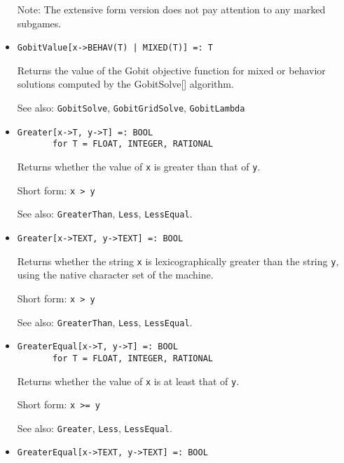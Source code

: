 \begin{itemize}
\item
[Note:] The extensive form version does not pay attention to any marked
subgames.
\ed

\item
\protect \large \begin{verbatim}
GobitValue[x->BEHAV(T) | MIXED(T)] =: T
\end{verbatim}\normalsize

\bd
Returns the value of the Gobit objective function for mixed or behavior solutions
computed by the GobitSolve[] algorithm. 
\item
[See also:] {\tt GobitSolve}, {\tt GobitGridSolve}, {\tt GobitLambda}
\ed

\item
\protect \large \begin{verbatim}
Greater[x->T, y->T] =: BOOL
       for T = FLOAT, INTEGER, RATIONAL
\end{verbatim}\normalsize

\bd
Returns whether the value of \verb+x+ is greater than
that of \verb+y+.
\item
[Short form:] \verb+x > y+
\item
[See also:] {\tt GreaterThan}, {\tt Less}, {\tt LessEqual}.
\ed

\item
\protect \large \begin{verbatim}
Greater[x->TEXT, y->TEXT] =: BOOL
\end{verbatim}\normalsize

\bd
Returns whether the string \verb+x+ is lexicographically greater than
the string \verb+y+, using the native character set of the machine.
\item
[Short form:] \verb+x > y+
\item
[See also:] {\tt GreaterThan}, {\tt Less}, {\tt LessEqual}.
\ed

\item
\protect \large \begin{verbatim}
GreaterEqual[x->T, y->T] =: BOOL
       for T = FLOAT, INTEGER, RATIONAL
\end{verbatim}\normalsize

\bd
Returns whether the value of \verb+x+ is at least that of
\verb+y+.
\item
[Short form:] \verb+x >= y+
\item
[See also:] {\tt Greater}, {\tt Less}, {\tt LessEqual}.
\ed

\item
\protect \large \begin{verbatim}
GreaterEqual[x->TEXT, y->TEXT] =: BOOL
\end{verbatim}\normalsize


\end{itemize}
